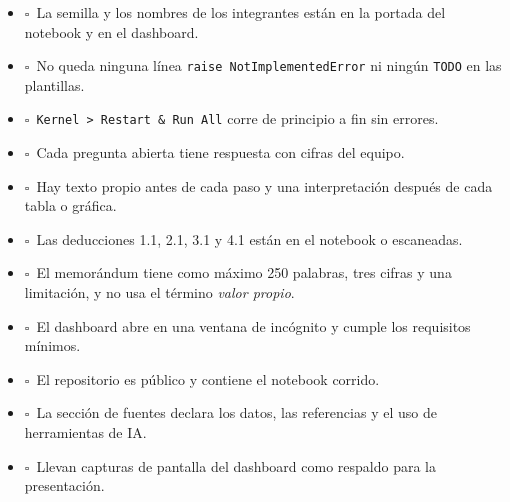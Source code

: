 \documentclass[10pt,letterpaper]{article}
\newcommand{\caja}{$\square$\ }
\begin{document}
\begin{itemize}[label={}]
  \item \caja La semilla y los nombres de los integrantes están en la portada del notebook y en el dashboard.
  \item \caja No queda ninguna línea \texttt{raise NotImplementedError} ni ningún \texttt{TODO} en las plantillas.
  \item \caja \texttt{Kernel > Restart \& Run All} corre de principio a fin sin errores.
  \item \caja Cada pregunta abierta tiene respuesta con cifras del equipo.
  \item \caja Hay texto propio antes de cada paso y una interpretación después de cada tabla o gráfica.
  \item \caja Las deducciones 1.1, 2.1, 3.1 y 4.1 están en el notebook o escaneadas.
  \item \caja El memorándum tiene como máximo 250 palabras, tres cifras y una limitación, y no usa el término \emph{valor propio}.
  \item \caja El dashboard abre en una ventana de incógnito y cumple los requisitos mínimos.
  \item \caja El repositorio es público y contiene el notebook corrido.
  \item \caja La sección de fuentes declara los datos, las referencias y el uso de herramientas de IA.
  \item \caja Llevan capturas de pantalla del dashboard como respaldo para la presentación.
\end{itemize}
\end{document}

